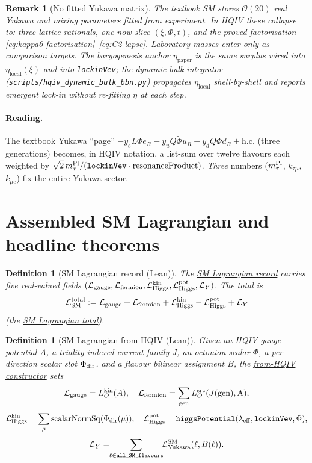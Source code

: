\documentclass[11pt]{amsart}
\newtheorem{definition}[theorem]{Definition}
\newtheorem{remark}[theorem]{Remark}
\begin{document}
\begin{remark}[No fitted Yukawa matrix]
\label{rem:no-fits}
The textbook SM stores $\mathcal{O}(20)$ real Yukawa and mixing parameters
fitted from experiment. In HQIV these collapse to: three lattice rationals,
one now slice $(\xi,\Phi,t)$, and the proved factorisation
\eqref{eq:kappa6-factorisation}--\eqref{eq:C2-lapse}. Laboratory masses
enter only as comparison targets. The baryogenesis anchor
$\eta_{\mathrm{paper}}$ is the same surplus wired into
$\eta_{\mathrm{local}}(\xi)$ and into \texttt{lockinVev}; the dynamic
bulk integrator (\texttt{scripts/hqiv\_dynamic\_bulk\_bbn.py}) propagates
$\eta_{\mathrm{local}}$ shell-by-shell and reports emergent lock-in without
re-fitting $\eta$ at each step.
\end{remark}

\paragraph{Reading.}
The textbook Yukawa ``page'' $-y_e\bar L\Phi e_R - y_u\bar Q\tilde\Phi u_R
- y_d\bar Q\Phi d_R + \text{h.c.}$ (three generations) becomes, in HQIV
notation, a list-sum over twelve flavours each weighted by
$\sqrt{2}\,m_\tau^{\rm Pl}/(\texttt{lockinVev}\cdot\mathrm{resonanceProduct})$.
\emph{Three} numbers ($m_\tau^{\rm Pl}$, $k_{\tau\mu}$, $k_{\mu e}$) fix the
entire Yukawa sector.

\section{Assembled SM Lagrangian and headline theorems}
\label{sec:assembly}

\begin{definition}[SM Lagrangian record (Lean)]
\label{def:SM-record}
The \hyperref[lean:SM-record]{SM Lagrangian record} carries five real-valued fields
$(\mathcal{L}_{\rm gauge},\mathcal{L}_{\rm fermion},
\mathcal{L}_{\rm Higgs}^{\rm kin},\mathcal{L}_{\rm Higgs}^{\rm pot},
\mathcal{L}_Y)$. The total is
\[
\mathcal{L}_{\rm SM}^{\rm total}
:= \mathcal{L}_{\rm gauge} + \mathcal{L}_{\rm fermion}
+ \mathcal{L}_{\rm Higgs}^{\rm kin} - \mathcal{L}_{\rm Higgs}^{\rm pot}
+ \mathcal{L}_Y
\]
(the \hyperref[lean:SM-total]{SM Lagrangian total}).
\end{definition}

\begin{definition}[SM Lagrangian from HQIV (Lean)]
\label{def:SM-fromHQIV}
Given an HQIV gauge potential $A$, a triality-indexed current family $J$,
an octonion scalar $\Phi$, a per-direction scalar slot $\Phi_{\rm dir}$, and
a flavour bilinear assignment $B$, the
\hyperref[lean:SM-fromHQIV]{from-HQIV constructor} sets
\[
\mathcal{L}_{\rm gauge} = L_O^{\rm kin}(A),\quad
\mathcal{L}_{\rm fermion} = \sum_{\rm gen}L_O^{\rm src}(J(\rm gen),A),
\]
\[
\mathcal{L}_{\rm Higgs}^{\rm kin} = \sum_\mu \mathrm{scalarNormSq}(\Phi_{\rm dir}(\mu)),\quad
\mathcal{L}_{\rm Higgs}^{\rm pot} = \texttt{higgsPotential}(\lambda_{\rm eff},\texttt{lockinVev},\Phi),
\]
\[
\mathcal{L}_Y = \!\!\sum_{\ell\in\texttt{all\_SM\_flavours}}\!\! \mathcal{L}^{\rm SM}_{\rm Yukawa}(\ell, B(\ell)) .
\]
\end{definition}
\end{document}
